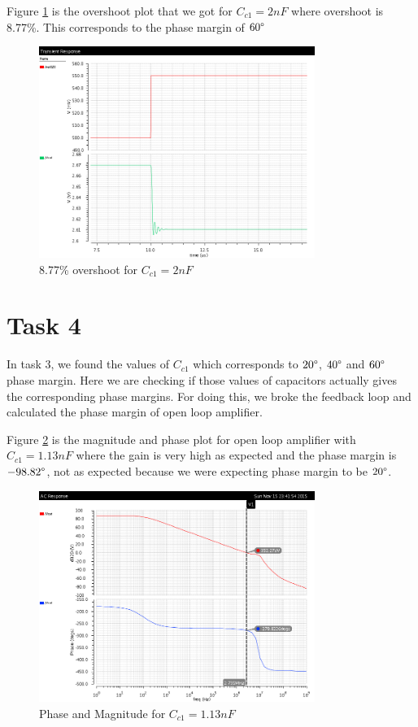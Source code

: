 \documentclass[a4paper,english,11pt]{article}
\begin{document}
Figure \ref{pm60} is the overshoot plot that we got for  $C_{c1} = 2 nF$ where overshoot is 8.77\%. This corresponds to the phase margin of $60\degree$
\begin{figure}[H]
 \centering
  \includegraphics[width=0.8\textwidth]{img/cad_pm/pm_60_2nF.png}
  \caption{8.77\% overshoot for $C_{c1} = 2nF$}
  \label{pm60}	
\end{figure}
\section{Task 4}
In task 3, we found the values of  $C_{c1}$ which corresponds to $ 20\degree$, $40\degree$ and $60\degree$  phase margin. Here we are checking if those values of capacitors actually gives the corresponding phase margins. For doing this, we broke the feedback loop and calculated the phase margin of open loop amplifier.

Figure \ref{pm20check} is the magnitude and phase plot for open loop amplifier with $C_{c1} = 1.13nF$ where the gain is very high as expected and the phase margin is $-98.82\degree$, not as expected because  we were expecting phase margin to be $20\degree$.
\begin{figure}[H]
 \centering
  \includegraphics[width=0.8\textwidth]{img/cad_pm/pm_113nF.png}
  \caption{Phase and Magnitude for $C_{c1} = 1.13nF$}
  \label{pm20check}	
\end{figure}
\end{document}
